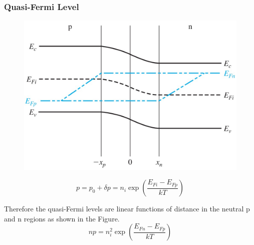 \documentclass{beamer}
\begin{document}
    \begin{frame} \frametitle{Quasi-Fermi Level}
        \begin{figure}[H]
            \centering
            \includegraphics[width=0.5\linewidth]{Quasi-fermi-level.jpg}
            \label{fig:Quasi-fermi-level-1.jpg}
        \end{figure}
        \begin{equation*}
            p = p_0 + \delta p = n_i \exp\left( \frac{E_{Fi} - E_{Fp} }{kT}  \right)
        \end{equation*}
        \par Therefore the quasi-Fermi levels are linear functions of distance in the neutral p and n regions as shown in the Figure.
        \begin{equation*}
            np = n_i^2 \exp \left( \frac{E_{Fn} - E_{Fp} }{kT}  \right)
        \end{equation*}
    \end{frame}
\end{document}

